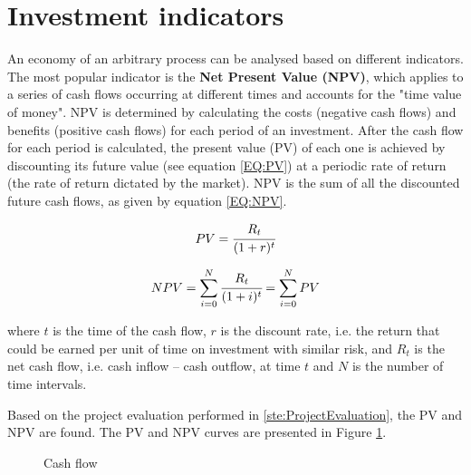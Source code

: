 	\newpage
	\section{Investment indicators}
	
	An economy of an arbitrary process can be analysed based on different indicators. The most popular indicator is the \textbf{Net Present Value (NPV)}, which applies to a series of cash flows occurring at different times and accounts for the "time value of money". NPV is determined by calculating the costs (negative cash flows) and benefits (positive cash flows) for each period of an investment. After the cash flow for each period is calculated, the present value (PV) of each one is achieved by discounting its future value (see equation \ref{EQ:PV}) at a periodic rate of return (the rate of return dictated by the market). NPV is the sum of all the discounted future cash flows, as given by equation \ref{EQ:NPV}.
	
	\begin{equation}
		PV = \cfrac{R_t}{(1+r)^t}
		\label{EQ:PV}
	\end{equation}

	\begin{equation}
		NPV = \sum_{i=0}^{N} \cfrac{R_{t}}{(1+i)^t} = \sum_{i=0}^{N} PV
		\label{EQ:NPV}
	\end{equation}

	where $t$ is the time of the cash flow, $r$ is the discount rate, i.e. the return that could be earned per unit of time on investment with similar risk, and $R_{t}$ is the net cash flow, i.e. cash inflow – cash outflow, at time $t$ and $N$ is the number of time intervals.
	
	Based on the project evaluation performed in \ref{ste:ProjectEvaluation}, the PV and NPV are found. The PV and NPV curves are presented in Figure \ref{fig:CashFlow}.
	
	\begin{figure}[h!]
		\centering
	\caption{Cash flow}
	\label{fig:CashFlow}
	\end{figure}

